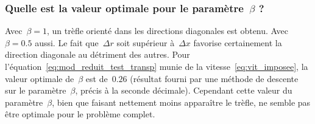 \documentclass[main.tex]{subfiles}
\begin{document}
\subsubsection{
Quelle est la valeur optimale pour le paramètre~$\beta$ ?} 
Avec~$\beta=1$, un trèfle orienté dans les directions diagonales est obtenu. 
Avec~$\beta=0.5$ aussi. Le fait que~$\Delta r$ soit supérieur à~$\Delta x$ favorise certainement la direction diagonale au détriment des autres. 
Pour l'équation~\eqref{eq:mod_reduit_test_transp} munie de la vitesse~\eqref{eq:vit_imposee}, la valeur optimale de~$\beta$ est de~$0.26$ (résultat fourni par une méthode de descente sur le paramètre~$\beta$, précis à la seconde décimale). 
Cependant cette valeur du paramètre~$\beta$, bien que faisant nettement moins apparaître le trèfle, ne semble pas être optimale pour le problème complet. 
\end{document}
